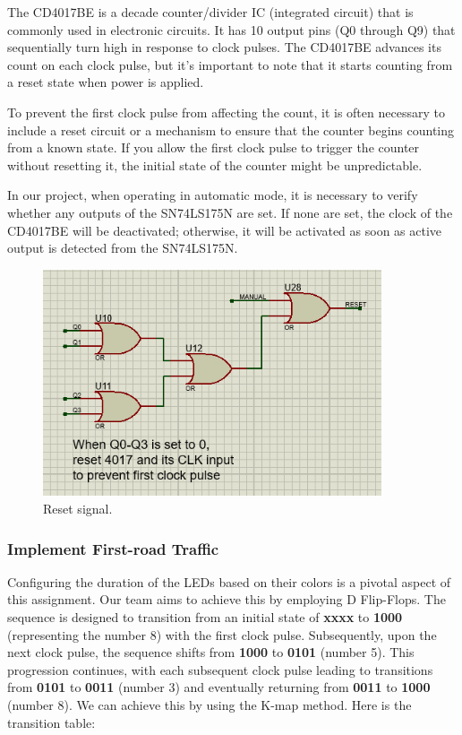 \documentclass{article}
\begin{document}
The CD4017BE is a decade counter/divider IC (integrated circuit) that is commonly used in electronic circuits. It has 10 output pins (Q0 through Q9) that sequentially turn high in response to clock pulses. The CD4017BE advances its count on each clock pulse, but it's important to note that it starts counting from a reset state when power is applied.

To prevent the first clock pulse from affecting the count, it is often necessary to include a reset circuit or a mechanism to ensure that the counter begins counting from a known state. If you allow the first clock pulse to trigger the counter without resetting it, the initial state of the counter might be unpredictable.

In our project, when operating in automatic mode, it is necessary to verify whether any outputs of the SN74LS175N are set. If none are set, the clock of the CD4017BE will be deactivated; otherwise, it will be activated as soon as active output is detected from the SN74LS175N.\par

\begin{figure}[h]
    \centering
    \includegraphics[width=10cm]{Pic/Proteus/Reset signal.png}
    \caption{Reset signal.}
    \label{fig:enter-label}
\end{figure}

\subsubsection{Implement First-road Traffic}
Configuring the duration of the LEDs based on their colors is a pivotal aspect of this assignment. Our team aims to achieve this by employing D Flip-Flops. The sequence is designed to transition from an initial state of \textbf{xxxx} to \textbf{1000} (representing the number 8) with the first clock pulse. Subsequently, upon the next clock pulse, the sequence shifts from \textbf{1000} to \textbf{0101} (number 5). This progression continues, with each subsequent clock pulse leading to transitions from \textbf{0101} to \textbf{0011} (number 3) and eventually returning from \textbf{0011} to \textbf{1000} (number 8). We can achieve this by using the K-map method. Here is the transition table:\par
\end{document}
